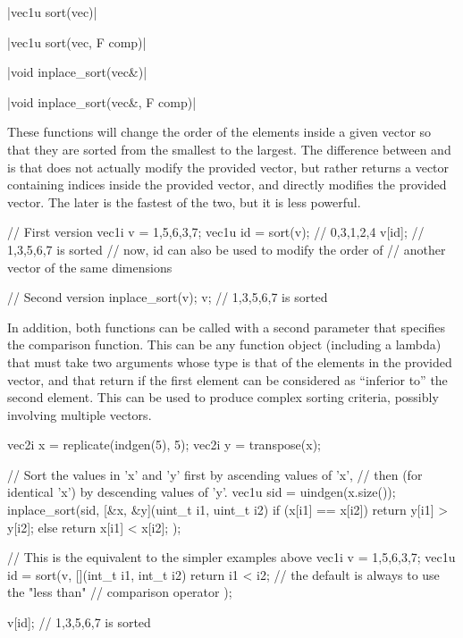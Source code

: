 \funcitem \cppinline|vec1u sort(vec)| 

\cppinline|vec1u sort(vec, F comp)|

\cppinline|void inplace_sort(vec&)| 

\cppinline|void inplace_sort(vec&, F comp)|

These functions will change the order of the elements inside a given vector so that they are sorted from the smallest to the largest. The difference between  and  is that  does not actually modify the provided vector, but rather returns a vector containing indices inside the provided vector, and  directly modifies the provided vector. The later is the fastest of the two, but it is less powerful.

\begin{example}
\begin{cppcode}
// First version
vec1i v = {1,5,6,3,7};
vec1u id = sort(v); // {0,3,1,2,4}
v[id]; // {1,3,5,6,7} is sorted
// now, id can also be used to modify the order of
// another vector of the same dimensions

// Second version
inplace_sort(v);
v; // {1,3,5,6,7} is sorted
\end{cppcode}
\end{example}

\begin{advanced}
In addition, both functions can be called with a second parameter that specifies the comparison function. This can be any function object (including a lambda) that must take two arguments whose type is that of the elements in the provided vector, and that return  if the first element can be considered as ``inferior to'' the second element. This can be used to produce complex sorting criteria, possibly involving multiple vectors.

\begin{example}
\begin{cppcode}
vec2i x = replicate(indgen(5), 5);
vec2i y = transpose(x);

// Sort the values in 'x' and 'y' first by ascending values of 'x',
// then (for identical 'x') by descending values of 'y'.
vec1u sid = uindgen(x.size());
inplace_sort(sid, [&x, &y](uint_t i1, uint_t i2) {
    if (x[i1] == x[i2]) return y[i1] > y[i2];
    else                return x[i1] < x[i2];
});

// This is the equivalent to the simpler examples above
vec1i v = {1,5,6,3,7};
vec1u id = sort(v, [](int_t i1, int_t i2) {
    return i1 < i2; // the default is always to use the "less than"
                    // comparison operator
});

v[id]; // {1,3,5,6,7} is sorted
\end{cppcode}
\end{example}
\end{advanced}

